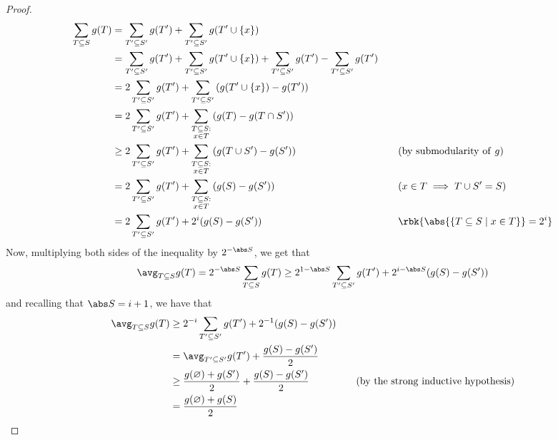 \documentclass[a4paper, 12pt]{report}
\begin{document}
\begin{proof}
        \begin{equation*}
            \begin{alignedat}{2}
                \sum_{T \subseteq S}{g(T)} &= \sum_{T' \subseteq S'}{g(T')} + \sum_{T' \subseteq S'}{g(T' \cup \{x\})} && \\
                                           &= \sum_{T' \subseteq S'}{g(T')} + \sum_{T' \subseteq S'}{g(T' \cup \{x\})} + \sum_{T' \subseteq S'}{g(T')} - \sum_{T' \subseteq S'}{g(T')} && \\
                                           &= 2\sum_{T' \subseteq S'}{g(T')} + \sum_{T' \subseteq S'}{(g(T' \cup \{x\}) - g(T'))} && \\
                                           &= 2\sum_{T' \subseteq S'}{g(T')} + \sum_{\substack{T \subseteq S : \\ x \in T}}{(g(T) - g(T \cap S'))} && \\
                                           &\ge 2\sum_{T' \subseteq S'}{g(T')} + \sum_{\substack{T \subseteq S : \\ x \in T}}{(g(T \cup S') - g(S'))} && \quad \quad (\mathrm{by \ submodularity \ of} \ g) \\
                                           &= 2\sum_{T' \subseteq S'}{g(T')} + \sum_{\substack{T \subseteq S : \\ x \in T}}{(g(S) - g(S'))} && \quad \quad (x \in T \implies T \cup S' = S) \\
                                           &= 2\sum_{T' \subseteq S'}{g(T')} + 2^i(g(S) - g(S')) && \quad \quad \rbk{\abs{\{T \subseteq S \mid x \in T\}} = 2^i} \\
            \end{alignedat}
        \end{equation*}
        Now, multiplying both sides of the inequality by $2^{- \abs S}$, we get that $$\avg_{T \subseteq S}{g(T)} = 2^{- \abs S}\sum_{T \subseteq S}{g(T)} \ge 2 ^{1 - \abs S}\sum_{T' \subseteq S'}{g(T')} + 2^{i - \abs S}(g(S) - g(S'))$$ and recalling that $\abs S = i + 1$, we have that
        \begin{equation*}
            \begin{alignedat}{2}
                \avg_{T \subseteq S}{g(T)} &\ge 2^{- i}\sum_{T' \subseteq S'}{g(T')} + 2^{-1}(g(S) - g(S')) && \\
                                           &= \avg_{T' \subseteq S'}{g(T')} + \dfrac{g(S) - g(S')}{2} && \\
                                           &\ge \dfrac{g(\varnothing) + g(S')}{2} + \dfrac{g(S) - g(S')}{2} && \quad \quad (\mathrm{by \ the \ strong \ inductive \ hypothesis}) \\
                                           &= \dfrac{g(\varnothing) + g(S)}{2}
            \end{alignedat}
        \end{equation*}
    \end{proof}
\end{document}
